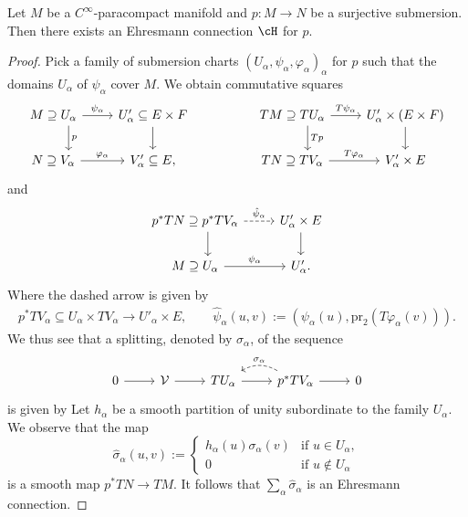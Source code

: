 \begin{Lemma}\label{lem:ex_Ehresmann}
Let $M$ be a $C^\infty$-paracompact manifold and $p\colon M \rightarrow N$ be a surjective submersion. Then there exists an Ehresmann connection $\cH$ for $p$.
\end{Lemma}

\begin{proof}
 Pick a family of submersion charts $(U_\alpha, \psi_\alpha,\varphi_\alpha)_{\alpha}$ for $p$ such that the domains $U_\alpha$ of $\psi_\alpha$ cover $M$.
 We obtain commutative squares
 \begin{equation*}
 \begin{tikzcd}
 M \supseteq U_{\alpha} \ar[r,"\psi_{\alpha}"] \ar[d,"p", shift left=12pt] & U'_{\alpha}\subseteq E \times F \ar[d] & & TM \supseteq TU_{\alpha} \ar[r,"T\psi_{\alpha}"] \ar[d,"Tp", shift left=12pt] & U_{\alpha}' \times (E \times F) \ar[d] \\
 N \supseteq V_{\alpha} \ar[r,"\varphi_{\alpha}"] & V'_{\alpha} \subseteq E, & & TN \supseteq TV_{\alpha} \ar[r,"T\varphi_{\alpha}"] & V'_{\alpha} \times E
 \end{tikzcd}
 \end{equation*}
 and
 \begin{equation*}
 \begin{tikzcd}
 p^{*}TN\supseteq p^{*}TV_{\alpha} \ar[d, shift left=10pt] \ar[r, dashed,"\hat{\psi}_{\alpha}"] & U'_{\alpha} \times E \ar[d] \\
 M \supseteq U_{\alpha} \ar[r,"\psi_{\alpha}"] & U'_{\alpha}.
 \end{tikzcd}
 \end{equation*}
 Where the dashed arrow is given by
 \begin{align*}
 p^{*}TV_{\alpha} \subseteq U_{\alpha} \times TV_{\alpha} \rightarrow U'_{\alpha} \times E,\qquad \hat{\psi}_{\alpha}(u,v) := (\psi_{\alpha}(u), \mathrm{pr}_{2}(T\varphi_{\alpha}(v))).
 \end{align*}
 We thus see that a splitting, denoted by $\sigma_{\alpha}$, of the sequence
 \begin{equation*}
 \begin{tikzcd}
 0 \ar[r] & \mathcal{V} \ar[r] & TU_{\alpha} \ar[r] & p^{*}TV_{\alpha} \ar[r] \ar[l,bend right, dashed, "\sigma_{\alpha}"'] & 0
 \end{tikzcd}
 \end{equation*}
 is given by
 Let $h_{\alpha}$ be a smooth partition of unity subordinate to the family $U_{\alpha}$.
 We observe that the map
 \begin{equation*}
 \hat{\sigma}_{\alpha}(u,v) := \begin{cases}
 h_{\alpha}(u) \sigma_{\alpha}(v) & \text{if } u \in U_{\alpha}, \\
 0 & \text{if } u \notin U_{\alpha}
 \end{cases}
 \end{equation*}
 is a smooth map $p^{*}TN \rightarrow TM$.
 It follows that $\sum_{\alpha} \hat{\sigma}_{\alpha}$ is an Ehresmann connection.
\end{proof}

